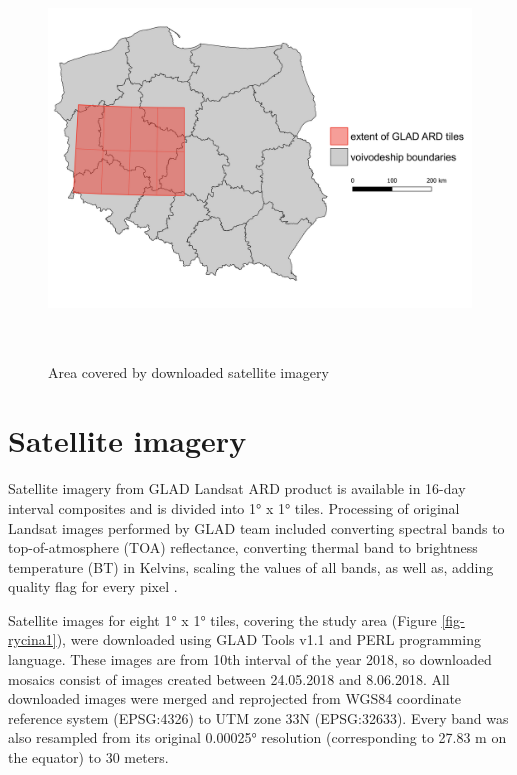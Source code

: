 \documentclass{amuthesis}
\begin{document}
\begin{figure}[H]

{\centering \includegraphics[width=5.875in,height=4.16667in]{./figures/study_area.png}

}

\caption{\label{fig-rycina2}Area covered by downloaded satellite
imagery}

\end{figure}

\hypertarget{sec-sat}{%
\section{Satellite imagery}\label{sec-sat}}

Satellite imagery from GLAD Landsat ARD product is available in 16-day
interval composites and is divided into 1° x 1° tiles. Processing of
original Landsat images performed by GLAD team included converting
spectral bands to top-of-atmosphere (TOA) reflectance, converting
thermal band to brightness temperature (BT) in Kelvins, scaling the
values of all bands, as well as, adding quality flag for every pixel
\autocite{potapov_landsat_2020}.

Satellite images for eight 1° x 1° tiles, covering the study area
(Figure \ref{fig-rycina1}), were downloaded using GLAD Tools v1.1 and
PERL programming language. These images are from 10th interval of the
year 2018, so downloaded mosaics consist of images created between
24.05.2018 and 8.06.2018. All downloaded images were merged and
reprojected from WGS84 coordinate reference system (EPSG:4326) to UTM
zone 33N (EPSG:32633). Every band was also resampled from its original
0.00025° resolution (corresponding to 27.83 m on the equator) to 30
meters.
\end{document}
